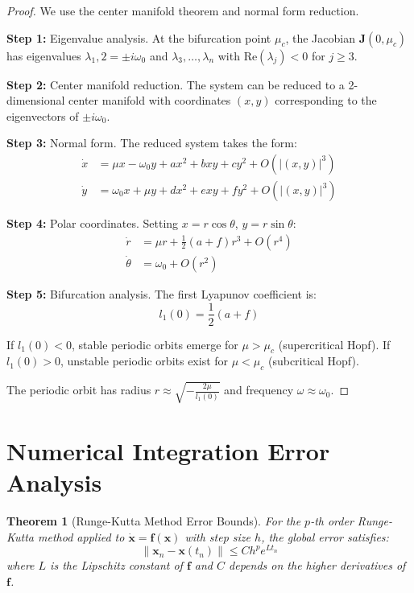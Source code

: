 \documentclass{article}
\newtheorem{theorem}{Theorem}
\begin{document}
\begin{proof}
We use the center manifold theorem and normal form reduction.

\textbf{Step 1:} Eigenvalue analysis. At the bifurcation point $\mu_c$, the Jacobian $\mathbf{J}(0, \mu_c)$ has eigenvalues $\lambda_1,2 = \pm i\omega_0$ and $\lambda_3, \ldots, \lambda_n$ with $\text{Re}(\lambda_j) < 0$ for $j \geq 3$.

\textbf{Step 2:} Center manifold reduction. The system can be reduced to a 2-dimensional center manifold with coordinates $(x,y)$ corresponding to the eigenvectors of $\pm i\omega_0$.

\textbf{Step 3:} Normal form. The reduced system takes the form:
\begin{align}
\dot{x} &= \mu x - \omega_0 y + a x^2 + b xy + c y^2 + O(|(x,y)|^3) \\
\dot{y} &= \omega_0 x + \mu y + d x^2 + e xy + f y^2 + O(|(x,y)|^3)
\end{align}

\textbf{Step 4:} Polar coordinates. Setting $x = r\cos\theta$, $y = r\sin\theta$:
\begin{align}
\dot{r} &= \mu r + \frac{1}{2}(a+f)r^3 + O(r^4) \\
\dot{\theta} &= \omega_0 + O(r^2)
\end{align}

\textbf{Step 5:} Bifurcation analysis. The first Lyapunov coefficient is:
\begin{equation}
l_1(0) = \frac{1}{2}(a+f)
\end{equation}

If $l_1(0) < 0$, stable periodic orbits emerge for $\mu > \mu_c$ (supercritical Hopf).
If $l_1(0) > 0$, unstable periodic orbits exist for $\mu < \mu_c$ (subcritical Hopf).

The periodic orbit has radius $r \approx \sqrt{-\frac{2\mu}{l_1(0)}}$ and frequency $\omega \approx \omega_0$.
\end{proof}

\section{Numerical Integration Error Analysis}

\begin{theorem}[Runge-Kutta Method Error Bounds]
For the $p$-th order Runge-Kutta method applied to $\dot{\mathbf{x}} = \mathbf{f}(\mathbf{x})$ with step size $h$, the global error satisfies:
\begin{equation}
\|\mathbf{x}_n - \mathbf{x}(t_n)\| \leq C h^p e^{Lt_n}
\end{equation}
where $L$ is the Lipschitz constant of $\mathbf{f}$ and $C$ depends on the higher derivatives of $\mathbf{f}$.
\end{theorem}
\end{document}
